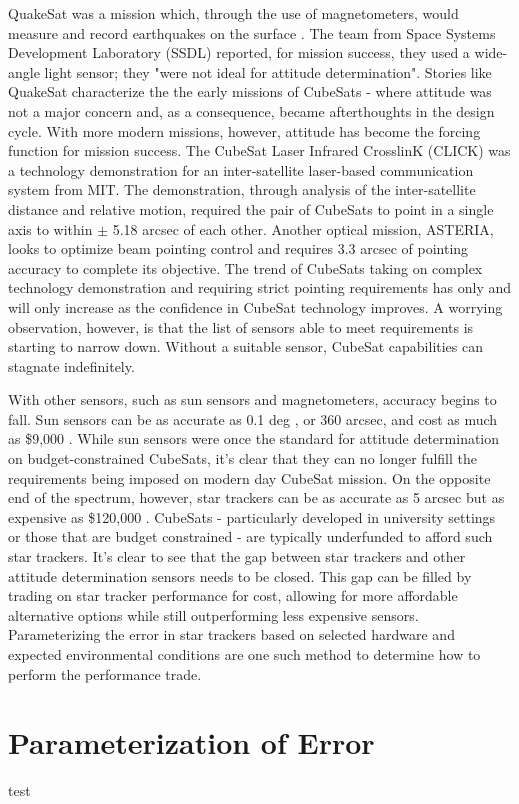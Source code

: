 \par \qquad QuakeSat was a mission which, through the use of magnetometers, would measure and record earthquakes on the surface \cite{QuakeSat}.
The team from Space Systems Development Laboratory (SSDL) reported, for mission success, they used a wide-angle light sensor; they "were not ideal for attitude determination"\cite{QuakeSat}.
Stories like QuakeSat characterize the the early missions of CubeSats - where attitude was not a major concern and, as a consequence, became afterthoughts in the design cycle.
With more modern missions, however, attitude has become the forcing function for mission success.
The CubeSat Laser Infrared CrosslinK (CLICK) was a technology demonstration for an inter-satellite laser-based communication system from MIT\cite{CubeSatCLICK}.
The demonstration, through analysis of the inter-satellite distance and relative motion, required the pair of CubeSats to point in a single axis to within $\pm$ 5.18 arcsec of each other.
Another optical mission, ASTERIA, looks to optimize beam pointing control and requires 3.3 arcsec \cite{OnOrbitBeamCalibration} of pointing accuracy to complete its objective.
The trend of CubeSats taking on complex technology demonstration and requiring strict pointing requirements has only and will only increase as the confidence in CubeSat technology improves.
A worrying observation, however, is that the list of sensors able to meet requirements is starting to narrow down. 
Without a suitable sensor, CubeSat capabilities can stagnate indefinitely.

\par \qquad With other sensors, such as sun sensors and magnetometers, accuracy begins to fall.
Sun sensors can be as accurate as 0.1 deg \cite{SunSensorA}, or 360 arcsec, and cost as much as \$9,000 \cite{CubeSatShop_SunSensor}. 
While sun sensors were once the standard for attitude determination on budget-constrained CubeSats, it's clear that they can no longer fulfill the requirements being imposed on modern day CubeSat mission.
On the opposite end of the spectrum, however, star trackers can be as accurate as 5 arcsec but as expensive as \$120,000 \cite{RocketLabStarTracker}.
CubeSats - particularly developed in university settings or those that are budget constrained - are typically underfunded to afford such star trackers. 
It's clear to see that the gap between star trackers and other attitude determination sensors needs to be closed. 
This gap can be filled by trading on star tracker performance for cost, allowing for more affordable alternative options while still outperforming less expensive sensors.
Parameterizing the error in star trackers based on selected hardware and expected environmental conditions are one such method to determine how to perform the performance trade.

\section{Parameterization of Error}

\par \qquad test